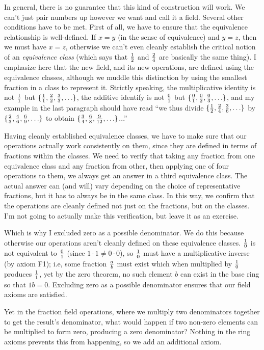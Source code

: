 In general, there is no guarantee that this kind of construction will
work.  We can't just pair numbers up however we want and call it a
field.  Several other conditions have to be met.  First of all, we
have to ensure that the equivalence relationship is well-defined.  If
$x=y$ (in the sense of equivalence) and $y=z$, then we must have
$x=z$, otherwise we can't even cleanly establish the critical notion
of an {\it equivalence class} (which says that $1\over2$ and $2\over4$
are basically the same thing).  I emphasize here that the new field,
and its new operations, are defined using the equivalence classes,
although we muddle this distinction by using the smallest fraction in
a class to represent it.  Strictly speaking, the multiplicative
identity is not ${1\over1}$ but
$\{{1\over1},{2\over2},{3\over3},\ldots\}$, the additive identify is
not ${0\over1}$ but $\{{0\over1},{0\over2},{0\over3},\ldots\}$, and my
example in the last paragraph should have read ``we thus divide
$\{{1\over2},{2\over4},{3\over6},\ldots\}$ by
$\{{2\over3},{4\over6},{6\over9},\ldots\}$ to obtain
$\{{3\over4},{6\over8},{9\over12},\ldots\}$...''

Having cleanly established equivalence
classes, we have to make sure that our operations actually work
consistently on them, since they are defined in terms of fractions
within the classes.  We need to verify that taking any fraction from
one equivalence class and any fraction from other, then applying one
of four operations to them, we always get an answer in a third
equivalence class.  The actual answer can (and will) vary depending on
the choice of representative fractions, but it has to always be in the
same class.  In this way, we confirm that the operations are cleanly
defined not just on the fractions, but on the classes.  I'm not going
to actually make this verification, but leave it as an exercise.

Which is why I excluded zero as a possible denominator.  We do this
because otherwise our operations aren't cleanly defined on these
equivalence classes. ${1\over0}$ is not equivalent to ${0\over1}$
(since $1\cdot1\ne0\cdot0$), so ${1\over0}$ must have a multiplicative
inverse (by axiom F1); i.e, some fraction ${a\over b}$ must exist
which when multiplied by ${1\over0}$ produces ${1\over1}$, yet by the
zero theorem, no such element $b$ can exist in the base ring so that
$1b=0$.  Excluding zero as a possible denominator ensures that our
field axioms are satisfied.

Yet in the fraction
field operations, where we multiply two denominators together to get
the result's denominator, what would happen if two non-zero elements can be
multiplied to form zero, producing a zero denominator?  Nothing
in the ring axioms prevents this from happening, so we add an
additional axiom.

